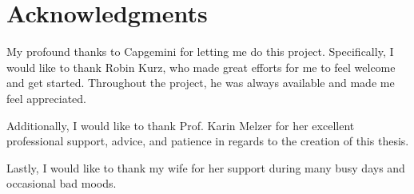 \chapter*{Acknowledgments}

My profound thanks to Capgemini for letting me do this project. Specifically, I would like to thank Robin Kurz, who made great efforts for me to feel welcome and get started. Throughout the project, he was always available and made me feel appreciated.

Additionally, I would like to thank Prof. Karin Melzer for her excellent professional support, advice, and patience in regards to the creation of this thesis.

Lastly, I would like to thank my wife for her support during many busy days and occasional bad moods.

\newpage
